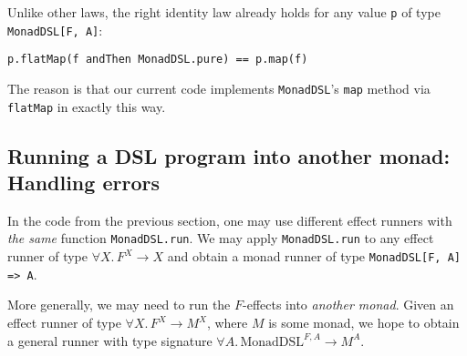 Unlike other laws, the right identity law already holds for any value
\lstinline!p! of type \lstinline!MonadDSL[F, A]!:
\begin{lstlisting}
p.flatMap(f andThen MonadDSL.pure) == p.map(f)
\end{lstlisting}
The reason is that our current code implements \lstinline!MonadDSL!\textsf{'}s
\lstinline!map! method
via \lstinline!flatMap!
in exactly this way. 

\subsection{Running a DSL program into another monad: Handling errors}

In the code from the previous section, one may use different effect
runners with \emph{the same} function \lstinline!MonadDSL.run!.
We may apply \lstinline!MonadDSL.run!
to any effect runner of type $\forall X.\,F^{X}\rightarrow X$ and
obtain a monad runner of type \lstinline!MonadDSL[F, A] => A!.

More generally, we may need to run the $F$-effects into \emph{another
monad}. Given an effect runner of type $\forall X.\,F^{X}\rightarrow M^{X}$,
where $M$ is some monad, we hope to obtain a general runner with
type signature $\forall A.\,\text{MonadDSL}^{F,A}\rightarrow M^{A}$.

